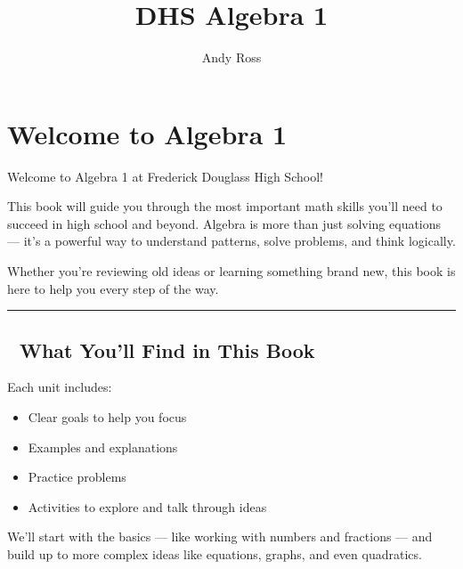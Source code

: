 \documentclass[
  letterpaper,
  DIV=11,
  numbers=noendperiod]{scrreprt}
\title{DHS Algebra 1}
\author{Andy Ross}
\date{}
\providecommand{\tightlist}{%
  \setlength{\itemsep}{0pt}\setlength{\parskip}{0pt}}
\renewcommand*\contentsname{Table of contents}
\newcommand\contentsname{Table of contents}
\begin{document}
\maketitle

\renewcommand*\contentsname{Table of contents}
{
\hypersetup{linkcolor=}
\setcounter{tocdepth}{2}
\tableofcontents
}


\chapter*{Welcome to Algebra 1}\label{welcome-to-algebra-1}


Welcome to Algebra 1 at Frederick Douglass High School!

This book will guide you through the most important math skills you'll
need to succeed in high school and beyond. Algebra is more than just
solving equations --- it's a powerful way to understand patterns, solve
problems, and think logically.

Whether you're reviewing old ideas or learning something brand new, this
book is here to help you every step of the way.

\begin{center}\rule{0.5\linewidth}{0.5pt}\end{center}

\section*{🧭 What You'll Find in This
Book}\label{what-youll-find-in-this-book}


Each unit includes:

\begin{itemize}
\tightlist
\item
  Clear goals to help you focus
\item
  Examples and explanations
\item
  Practice problems
\item
  Activities to explore and talk through ideas
\end{itemize}

We'll start with the basics --- like working with numbers and fractions
--- and build up to more complex ideas like equations, graphs, and even
quadratics.
\end{document}
